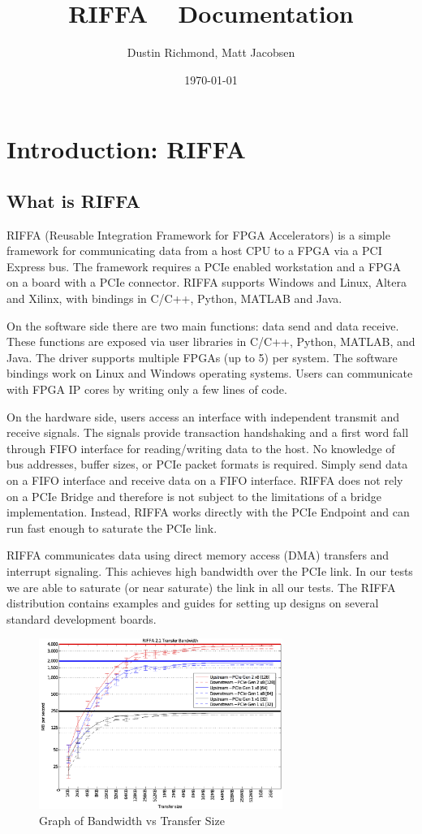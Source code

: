 \documentclass{refrep}
\title{RIFFA \RIFFAVer~ Documentation}
\author{Dustin Richmond, Matt Jacobsen}
\date{\today}
\begin{document}
\maketitle
\pagebreak
\tableofcontents

\chapter{Introduction: RIFFA}
\section{What is RIFFA}

RIFFA (Reusable Integration Framework for FPGA Accelerators) is a simple
framework for communicating data from a host CPU to a FPGA via a PCI Express
bus. The framework requires a PCIe enabled workstation and a FPGA on a board
with a PCIe connector. RIFFA supports Windows and Linux, Altera and Xilinx, with
bindings in C/C++, Python, MATLAB and Java.

On the software side there are two main functions: data send and data
receive. These functions are exposed via user libraries in C/C++, Python,
MATLAB, and Java. The driver supports multiple FPGAs (up to 5) per system. The
software bindings work on Linux and Windows operating systems. Users can
communicate with FPGA IP cores by writing only a few lines of code.

On the hardware side, users access an interface with independent transmit and
receive signals. The signals provide transaction handshaking and a first word
fall through FIFO interface for reading/writing data to the host. No knowledge
of bus addresses, buffer sizes, or PCIe packet formats is required. Simply send
data on a FIFO interface and receive data on a FIFO interface. RIFFA does not
rely on a PCIe Bridge and therefore is not subject to the limitations of a
bridge implementation. Instead, RIFFA works directly with the PCIe Endpoint and
can run fast enough to saturate the PCIe link.

RIFFA communicates data using direct memory access (DMA) transfers and interrupt
signaling. This achieves high bandwidth over the PCIe link. In our tests we are
able to saturate (or near saturate) the link in all our tests. The RIFFA distribution
contains examples and guides for setting up designs on several standard development
boards. 

\begin{figure}[H]
  \includegraphics[width=300px,center]{bw_sg_2_1_maxs.png}
  \caption{Graph of Bandwidth vs Transfer Size}
  \label{Fig:RIFFA:Performance}
\end{figure}
\end{document}
